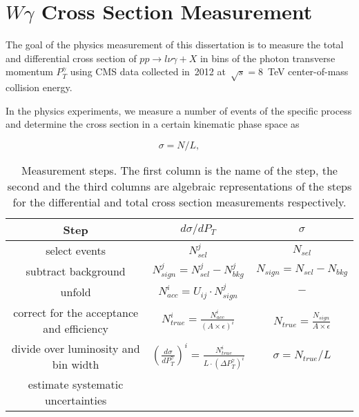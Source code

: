 \chapter{$W\gamma$ Cross Section Measurement}
\label{sec:AN_WgMeas}

The goal of the physics measurement of this dissertation is to measure the total and differential cross section of $pp \rightarrow l\nu\gamma + X$ in bins of the photon transverse momentum $P_T^\gamma$ using CMS data collected in~2012 at~$\sqrt{s}=8$~TeV center-of-mass collision energy. 

In the physics experiments, we measure a number of events of the specific process and determine the cross section in a certain kinematic phase space as

\begin{equation}
  \sigma = N/L,
\end{equation}

\begin{table}[h]
  \small
  \begin{center}
  \caption{Measurement steps. The first column is the name of the step, the second and the third columns are algebraic representations of the steps for the differential and total cross section measurements respectively. }
  \begin{tabular}{|c|c|c|}
    \hline
    Step & $d\sigma/dP_{T}$ & $\sigma$ \\ \hline
    select events & $N_{sel}^j$ &    $N_{sel}$       \\ \hline
    subtract background & $N_{sign}^j = N_{sel}^j - N_{bkg}^j$ &    $N_{sign}=N_{sel}-N_{bkg}$       \\ \hline
    unfold   & $N_{acc}^i = U_{ij} \cdot N_{sign}^j$ &    $-$       \\ \hline
    correct for the acceptance and efficiency & $N_{true}^i = \frac{N_{acc}^i}{(A \times\epsilon)^i}$ &  $N_{true}=\frac{N_{sign}}{A\times\epsilon}$       \\ \hline
    divide over luminosity and bin width & $ \left( \frac{d\sigma}{dP_{T}^\gamma} \right) ^i = \frac{N_{true}^i}{L \cdot (\Delta P_T^\gamma)^i}$  &  $\sigma = N_{true}/L$       \\ \hline
    estimate systematic uncertainties &  &         \\ \hline
  \end{tabular}
  \label{tab:analysisOutline}
  \end{center}
\end{table}

